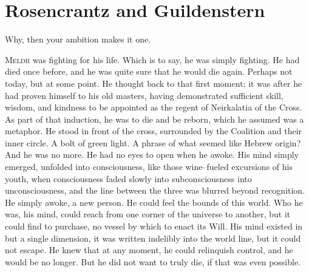 \chapter{Rosencrantz and Guildenstern}

{Why, then your ambition makes it one.}

\simpleline
\pagebreak
\lettrine{M}{eldh} was fighting for his life. Which is to say, he was simply fighting. He had died once before, and he was quite sure that he would die again. Perhaps not today, but at some point. He thought back to that first moment; it was after he had proven himself to his old masters, having demonstrated sufficient skill, wisdom, and kindness to be appointed as the regent of Neirkalatia of the Cross. As part of that induction, he was to die and be reborn, which he assumed was a metaphor. He stood in front of the cross, surrounded by the Coalition and their inner circle.
\SmallVSpace
A bolt of green light. A phrase of what seemed like Hebrew origin? And he was no more.
\SmallVSpace
He had no eyes to open when he awoke. His mind simply emerged, unfolded into consciousness, like those wine\mbox{--}fueled excursions of his youth, when consciousness faded slowly into subconsciousness into unconsciousness, and the line between the three was blurred beyond recognition. He simply awoke, a new person. He could feel the bounds of this world. Who he was, his mind, could reach from one corner of the universe to another, but it could find to purchase, no vessel by which to enact its Will. His mind existed in but a single dimension, it was written indelibly into the world line, but it could not escape. He knew that at any moment, he could relinquish control, and he would be no longer. But he did not want to truly die, if that was even possible.

